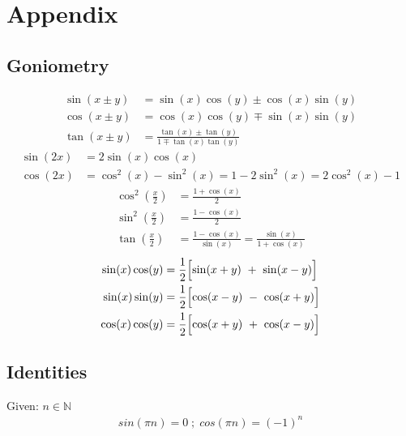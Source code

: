 \section{Appendix}
\subsection{Goniometry}
\begin{align*}
    \sin(x\pm y)&=\sin(x)\cos(y)\pm\cos(x)\sin(y)\\
    \cos(x\pm y)&=\cos(x)\cos(y)\mp\sin(x)\sin(y)\\
    \tan(x\pm y)&=\frac{\tan(x)\pm\tan(y)}{1\mp\tan(x)\tan(y)}
\end{align*}
\begin{align*}
    \sin(2x)&=2\sin(x)\cos(x)\\
    \cos(2x)&=\cos^2(x)-\sin^2(x)=1-2\sin^2(x)=2\cos^2(x)-1
\end{align*}
\begin{align*}
    \cos^2\left(\frac x2\right)&=\frac{1+\cos(x)}{2}\\
    \sin^2\left(\frac x2\right)&=\frac{1-\cos(x)}{2}\\
    \tan\left(\frac x2\right)&=\frac{1-\cos(x)}{\sin(x)}=\frac{\sin(x)}{1+\cos(x)}
\end{align*}
\begin{align*}
    \sin(x)\cos(y)&=\frac12\Bigl[\sin(x+y)~+~\sin(x-y)\Bigr]\\
    \sin(x)\sin(y)&=\frac12\Bigl[\cos(x-y)~-~\cos(x+y)\Bigr]\\
    \cos(x)\cos(y)&=\frac12\Bigl[\cos(x+y)~+~\cos(x-y)\Bigr]
\end{align*}
\subsection{Identities}
Given: $n \in \mathbb{N}$
\begin{align*}
    sin(\pi n) = 0 \; ;  \; cos(\pi n)=(-1)^n
\end{align*}